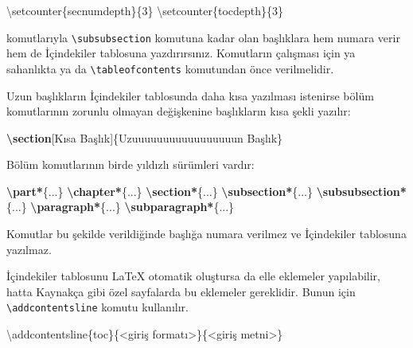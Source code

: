 \documentclass[
  10pt,
]{scrbook}
\newenvironment{Shaded}{}{}
\newcommand{\FunctionTok}[1]{\textcolor[rgb]{0.02,0.16,0.49}{#1}}
\newcommand{\KeywordTok}[1]{\textcolor[rgb]{0.00,0.44,0.13}{\textbf{#1}}}
\newcommand{\NormalTok}[1]{#1}
\theoremstyle{definition}
\theoremstyle{definition}
\theoremstyle{definition}
\theoremstyle{definition}
\theoremstyle{remark}
\begin{document}
\begin{Shaded}
\begin{Highlighting}[]
\FunctionTok{\textbackslash{}setcounter}\NormalTok{\{secnumdepth\}\{3\}}
\FunctionTok{\textbackslash{}setcounter}\NormalTok{\{tocdepth\}\{3\}}
\end{Highlighting}
\end{Shaded}

komutlarıyla \texttt{\textbackslash{}subsubsection} komutuna kadar olan başlıklara hem numara verir hem de İçindekiler tablosuna yazdırırsınız. Komutların çalışması için ya sahanlıkta ya da \texttt{\textbackslash{}tableofcontents} komutundan önce verilmelidir.

Uzun başlıkların İçindekiler tablosunda daha kısa yazılması istenirse bölüm komutlarının zorunlu olmayan değişkenine başlıkların kısa şekli yazılır:

\begin{Shaded}
\begin{Highlighting}[]
\KeywordTok{\textbackslash{}section}\NormalTok{[Kısa Başlık]\{Uzuuuuuuuuuuuuuuuuun Başlık\}}
\end{Highlighting}
\end{Shaded}

Bölüm komutlarının birde yıldızlı sürümleri vardır:

\begin{Shaded}
\begin{Highlighting}[]
\KeywordTok{\textbackslash{}part*}\NormalTok{\{...\}}
\KeywordTok{\textbackslash{}chapter*}\NormalTok{\{...\}}
\KeywordTok{\textbackslash{}section*}\NormalTok{\{...\}}
\KeywordTok{\textbackslash{}subsection*}\NormalTok{\{...\}}
\KeywordTok{\textbackslash{}subsubsection*}\NormalTok{\{...\}}
\KeywordTok{\textbackslash{}paragraph*}\NormalTok{\{...\}}
\KeywordTok{\textbackslash{}subparagraph*}\NormalTok{\{...\}}
\end{Highlighting}
\end{Shaded}

Komutlar bu şekilde verildiğinde başlığa numara verilmez ve İçindekiler tablosuna yazılmaz.

İçindekiler tablosunu LaTeX otomatik oluştursa da elle eklemeler yapılabilir, hatta Kaynakça gibi özel sayfalarda bu eklemeler gereklidir. Bunun için \texttt{\textbackslash{}addcontentsline} komutu kullanılır.

\begin{Shaded}
\begin{Highlighting}[]
\FunctionTok{\textbackslash{}addcontentsline}\NormalTok{\{toc\}\{\textless{}giriş formatı\textgreater{}\}\{\textless{}giriş metni\textgreater{}\}}
\end{Highlighting}
\end{Shaded}
\end{document}

